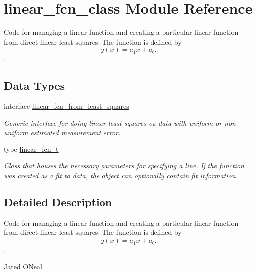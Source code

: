 \hypertarget{namespacelinear__fcn__class}{}\section{linear\+\_\+fcn\+\_\+class Module Reference}
\label{namespacelinear__fcn__class}


Code for managing a linear function and creating a particular linear function from direct linear least-\/squares. The function is defined by \[ y(x) = a_1x + a_0. \].  


\subsection*{Data Types}
\begin{DoxyCompactItemize}
\item 
interface \hyperlink{interfacelinear__fcn__class_1_1linear__fcn__from__least__squares}{linear\+\_\+fcn\+\_\+from\+\_\+least\+\_\+squares}
\begin{DoxyCompactList}\small\item\em Generic interface for doing linear least-\/squares on data with uniform or non-\/uniform estimated measurement error. \end{DoxyCompactList}\item 
type \hyperlink{structlinear__fcn__class_1_1linear__fcn__t}{linear\+\_\+fcn\+\_\+t}
\begin{DoxyCompactList}\small\item\em Class that houses the necessary parameters for specifying a line. If the function was created as a fit to data, the object can optionally contain fit information. \end{DoxyCompactList}\end{DoxyCompactItemize}


\subsection{Detailed Description}
Code for managing a linear function and creating a particular linear function from direct linear least-\/squares. The function is defined by \[ y(x) = a_1x + a_0. \]. 

Jared O\textquotesingle{}Neal 